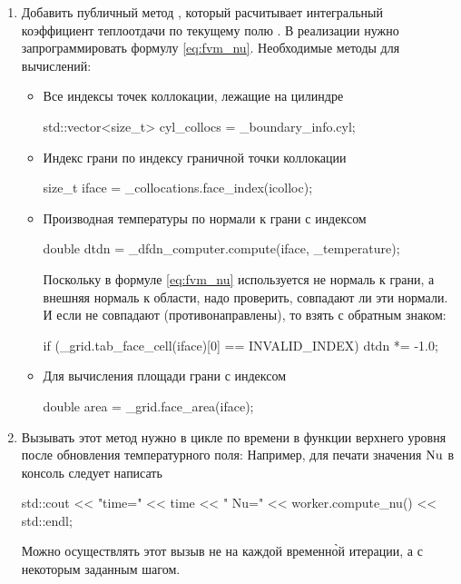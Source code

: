 \begin{enumerate}
\item
Добавить публичный метод , который расчитывает
интегральный коэффициент теплоотдачи по текущему полю .
В реализации нужно запрограммировать формулу \cref{eq:fvm_nu}.
Необходимые методы для вычислений:
	\begin{itemize}
	\item
	Все индексы точек коллокации, лежащие на цилиндре
	\begin{cppcode}
	std::vector<size_t> cyl_collocs = _boundary_info.cyl;
	\end{cppcode}
	\item
	Индекс грани по индексу граничной точки коллокации 
	\begin{cppcode}
	size_t iface = _collocations.face_index(icolloc);
	\end{cppcode}
	\item
	Производная температуры по нормали к грани с индексом 
	\begin{cppcode}
	double dtdn = _dfdn_computer.compute(iface, _temperature);
	\end{cppcode}
	Поскольку в формуле \cref{eq:fvm_nu} используется не нормаль к грани,
	а внешняя нормаль к области, надо проверить, совпадают ли эти нормали.
	И если не совпадают (противонаправлены), то взять  с обратным знаком:
	\begin{cppcode}
	if (_grid.tab_face_cell(iface)[0] == INVALID_INDEX){
		dtdn *= -1.0;
	}
	\end{cppcode}
	\item
	Для вычисления площади грани с индексом 
	\begin{cppcode}
	double area = _grid.face_area(iface);
	\end{cppcode}
	\end{itemize}

\item
{}
Вызывать этот метод нужно в цикле по времени в функции верхнего уровня
после обновления температурного поля:
Например, для печати значения $\mathrm{Nu}$ в консоль следует написать
\begin{cppcode}
std::cout << "time=" << time << " Nu=" << worker.compute_nu() << std::endl;
\end{cppcode}
Можно осуществлять этот вызыв не на каждой временн\`{о}й итерации, а с некоторым заданным шагом.





\end{enumerate}
